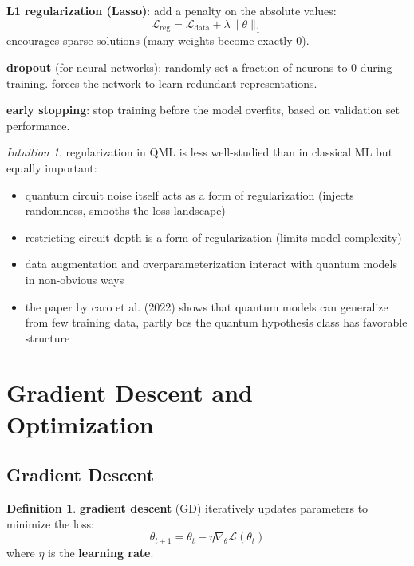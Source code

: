 \documentclass[11pt,a4paper]{article}
\theoremstyle{definition}
\newtheorem{definition}{Definition}[section]
\theoremstyle{remark}
\newtheorem*{intuition}{Intuition}
\begin{document}
\textbf{L1 regularization (Lasso)}: add a penalty on the absolute values:
\[
\mathcal{L}_{\text{reg}} = \mathcal{L}_{\text{data}} + \lambda \|\theta\|_1
\]
encourages sparse solutions (many weights become exactly 0).

\textbf{dropout} (for neural networks): randomly set a fraction of neurons to 0 during training. forces the network to learn redundant representations.

\textbf{early stopping}: stop training before the model overfits, based on validation set performance.

\begin{intuition}
regularization in QML is less well-studied than in classical ML but equally important:
\begin{itemize}
    \item quantum circuit noise itself acts as a form of regularization (injects randomness, smooths the loss landscape)
    \item restricting circuit depth is a form of regularization (limits model complexity)
    \item data augmentation and overparameterization interact with quantum models in non-obvious ways
    \item the paper by caro et al. (2022) shows that quantum models can generalize from few training data, partly bcs the quantum hypothesis class has favorable structure
\end{itemize}
\end{intuition}

\section{Gradient Descent and Optimization}

\subsection{Gradient Descent}

\begin{definition}
\textbf{gradient descent} (GD) iteratively updates parameters to minimize the loss:
\[
\boxed{\theta_{t+1} = \theta_t - \eta \nabla_\theta \mathcal{L}(\theta_t)}
\]
where $\eta$ is the \textbf{learning rate}.
\end{definition}
\end{document}
